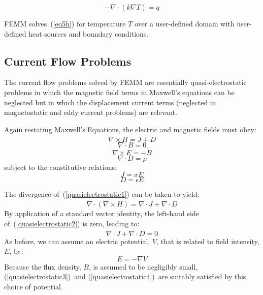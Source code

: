 \documentclass[12pt]{report}
\begin{document}
\begin{equation}
\label{eq5h}
 - \nabla \cdot \left( k \nabla T \right) = q
\end{equation}

\noindent
FEMM solves~(\ref{eq5h}) for temperature $T$ over a user-defined
domain with user-defined heat sources and boundary conditions.



\subsection{Current Flow Problems}

The current flow problems solved by FEMM are essentially quasi-electrostatic 
problems in which the magnetic field terms in Maxwell's equations can be neglected
but in which the displacement current terms (neglected in magnetostatic and eddy
current problems) are relevant.

Again restating Maxwell's Equations, the electric and magnetic fields must obey:
\begin{equation}
\label{quasielectrostatic1}
\nabla \times H = J + \dot{D}
\end{equation}
\begin{equation}
\label{quasielectrostatic3}
\nabla \cdot B = 0 
\end{equation}
\begin{equation}
\label{quasielectrostatic4}
\nabla \times E = -\dot{B}
\end{equation}
\begin{equation}
\nabla \cdot D = \rho
\end{equation}
subject to the constitutive relations:
\begin{equation}
J = \sigma E
\end{equation}
\begin{equation}
D = \epsilon E
\end{equation}

The divergence of~(\ref{quasielectrostatic1}) can be taken to yield:
\begin{equation} \label{quasielectrostatic2}
\nabla \cdot \left( \nabla \times H \right) = \nabla \cdot J + \nabla \cdot \dot{D}
\end{equation}
By application of a standard vector identity, the left-hand side 
of~(\ref{quasielectrostatic2})
is zero, leading to:
\begin{equation} \label{quasielectrostatic5}
\nabla \cdot J + \nabla \cdot \dot{D} = 0
\end{equation}
As before, we can assume an electric potential, $V$, that is related to field intensity,
$E$, by:
\begin{equation}
E = -\nabla V
\end{equation}
Because the flux density, $B$, is assumed to be negligibly small, (\ref{quasielectrostatic3})~and
(\ref{quasielectrostatic4})~are suitably satisfied by this choice of potential.
\end{document}
